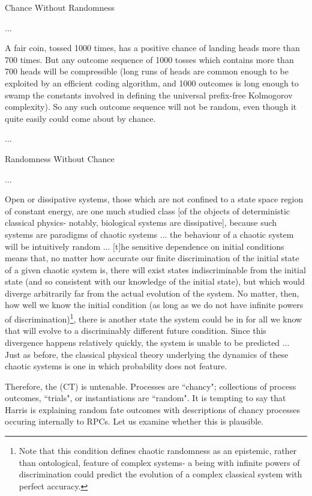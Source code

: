 \begin{longquote}
Chance Without Randomness

...

A fair coin, tossed 1000 times, has a positive chance of landing heads more than 700 times. But any outcome sequence of 1000 tosses which contains more than 700 heads will be compressible (long runs of heads are common enough to be exploited by an efficient coding algorithm, and 1000 outcomes is long enough to swamp the constants involved in defining the universal prefix-free Kolmogorov complexity). So any such outcome sequence will not be random, even though it quite easily could come about by chance. 

...

Randomness Without Chance

...

Open or dissipative systems, those which are not confined to a state space region of constant energy, are one much studied class [of the objects of deterministic classical physics- notably, biological systems are dissipative], because such systems are paradigms of chaotic systems ... the behaviour of a chaotic system will be intuitively random ... [t]he sensitive dependence on initial conditions means that, no matter how accurate our finite discrimination of the initial state of a given chaotic system is, there will exist states indiscriminable from the initial state (and so consistent with our knowledge of the initial state), but which would diverge arbitrarily far from the actual evolution of the system. No matter, then, how well we know the initial condition (as long as we do not have infinite powers of discrimination)\footnote{Note that this condition defines chaotic randomness as an epistemic, rather than ontological, feature of complex systems- a being with infinite powers of discrimination could predict the evolution of a complex classical system with perfect accuracy.}, there is another state the system could be in for all we know that will evolve to a discriminably different future condition. Since this divergence happens relatively quickly, the system is unable to be predicted ... Just as before, the classical physical theory underlying the dynamics of these chaotic systems is one in which probability does not feature. 
\cite{Eagle2018}
\end{longquote}

Therefore, the (CT) is untenable. Processes are ``chancy"; collections of process outcomes, ``trials", or instantiations are ``random". It is tempting to say that Harris is explaining random fate outcomes with descriptions of chancy processes occuring internally to RPCs. Let us examine whether this is plausible. 

